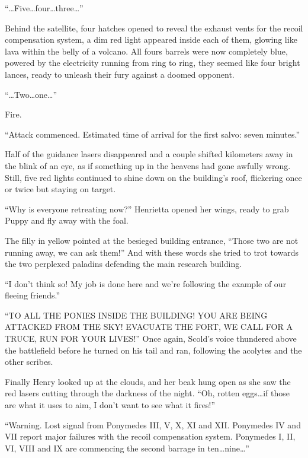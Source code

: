 ``{\mt \dots Five\dots four\dots three\dots}''

Behind the satellite, four hatches opened to reveal the exhaust vents for the recoil compensation system, a dim red light appeared inside each of them, glowing like lava within the belly of a volcano. All fours barrels were now completely blue, powered by the electricity running from ring to ring, they seemed like four bright lances, ready to unleash their fury against a doomed opponent.

``{\mt \dots Two\dots one\dots}''

Fire.

\horizonline


``{\mt Attack commenced. Estimated time of arrival for the first salvo: seven minutes.}''

Half of the guidance lasers disappeared and a couple shifted kilometers away in the blink of an eye, as if something up in the heavens had gone awfully wrong. Still, five red lights continued to shine down on the building's roof, flickering once or twice but staying on target.

``Why is everyone retreating now?'' Henrietta opened her wings, ready to grab Puppy and fly away with the foal.

The filly in yellow pointed at the besieged building entrance, ``Those two are not running away, we can ask them!'' And with these words she tried to trot towards the two perplexed paladins defending the main research building.

``I don't think so! My job is done here and we're following the example of our fleeing friends.''

``{\mt TO ALL THE PONIES INSIDE THE BUILDING! YOU ARE BEING ATTACKED FROM THE SKY! EVACUATE THE FORT, WE CALL FOR A TRUCE, RUN FOR YOUR LIVES!}'' Once again, Scold's voice thundered above the battlefield before he turned on his tail and ran, following the acolytes and the other scribes.

Finally Henry looked up at the clouds, and her beak hung open as she saw the red lasers cutting through the darkness of the night. ``Oh, rotten eggs\dots if those are what it uses to aim, I don't want to see what it fires!''

``{\mt Warning. Lost signal from Ponymedes III, V, X, XI and XII. Ponymedes IV and VII report major failures with the recoil compensation system. Ponymedes I, II, VI, VIII and IX are commencing the second barrage in ten\dots nine\dots}''

